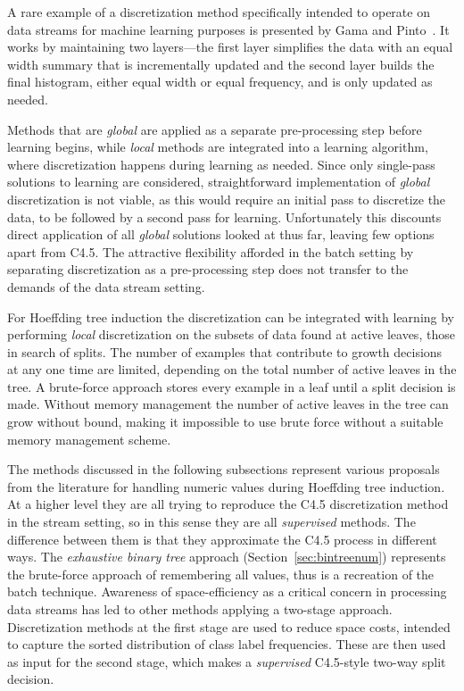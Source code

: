 A rare example of a discretization method specifically intended to operate on data streams for machine learning purposes is presented by Gama and Pinto~\cite{discretizeds}. It works by maintaining two layers---the first layer simplifies the data with an equal width summary that is incrementally updated and the second layer builds the final histogram, either equal width or equal frequency, and is only updated as needed.

Methods that are {\em global} are applied as a separate pre-processing step before learning begins, while {\em local} methods are integrated into a learning algorithm, where discretization happens during learning as needed. 
Since only single-pass solutions to learning are considered, straightforward implementation of {\em global} discretization is not viable, as this would require an initial pass to discretize the data, to be followed by a second pass for learning. Unfortunately this discounts direct application of all {\em global} solutions looked at thus far, leaving few options apart from C4.5. The attractive flexibility afforded in the batch setting by separating discretization as a pre-processing step does not transfer to the demands of the data stream setting.

For Hoeffding tree induction the discretization can be integrated with learning by performing {\em local} discretization on the subsets of data found at active leaves, those in search of splits. 
The number of examples that contribute to growth decisions at any one time are limited, depending on the total number of active leaves in the tree.
A brute-force approach stores every example in a leaf until a split decision is made. Without memory management the number of active leaves in the tree can grow without bound, making it impossible to use brute force without a suitable memory management scheme.

The methods discussed in the following subsections represent various proposals from the literature for handling numeric values during Hoeffding tree induction. At a higher level they are all trying to reproduce the C4.5 discretization method in the stream setting, so in this sense they are all {\em supervised} methods. The difference between them is that they approximate the C4.5 process in different ways. The {\em exhaustive binary tree} approach (Section~\ref{sec:bintreenum}) represents the brute-force approach of remembering all values, thus is a recreation of the batch technique. Awareness of space-efficiency as a critical concern in processing data streams has led to other methods applying a two-stage approach. Discretization methods at the first stage are used to reduce space costs, intended to capture the sorted distribution of class label frequencies. These are then used as input for the second stage, which makes a {\em supervised} C4.5-style two-way split decision.

